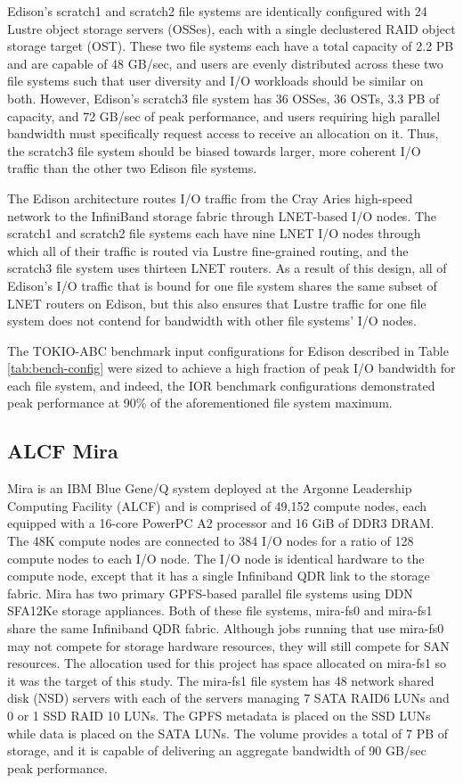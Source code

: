Edison's scratch1 and scratch2 file systems are identically configured with 24 Lustre object storage servers (OSSes), each with a single declustered RAID object storage target (OST).
These two file systems each have a total capacity of 2.2 PB and are capable of 48 GB/sec, and users are evenly distributed across these two file systems such that user diversity and I/O workloads should be similar on both.
However, Edison's scratch3 file system has 36 OSSes, 36 OSTs, 3.3 PB of capacity, and 72 GB/sec of peak performance, and users requiring high parallel bandwidth must specifically request access to receive an allocation on it.  Thus, the scratch3 file system should be biased towards larger, more coherent I/O traffic than the other two Edison file systems.

The Edison architecture routes I/O traffic from the Cray Aries high-speed network to the InfiniBand storage fabric through LNET-based I/O nodes.
The scratch1 and scratch2 file systems each have nine LNET I/O nodes through which all of their traffic is routed via Lustre fine-grained routing, and the scratch3 file system uses thirteen LNET routers.
As a result of this design, all of Edison's I/O traffic that is bound for one file system shares the same subset of LNET routers on Edison, but this also ensures that Lustre traffic for one file system does not contend for bandwidth with other file systems' I/O nodes.

The TOKIO-ABC benchmark input configurations for Edison described in Table \ref{tab:bench-config} were sized to achieve a high fraction of peak I/O bandwidth for each file system, and indeed, the IOR benchmark configurations demonstrated peak performance at 90\% of the aforementioned file system maximum.

\subsection{ALCF Mira} \label{sec:platforms/mira}

 Mira is an IBM Blue Gene/Q system deployed at the Argonne Leadership Computing Facility (ALCF) and is comprised of 49,152 compute nodes, each equipped with a 16-core PowerPC A2 processor and 16 GiB of DDR3 DRAM. The 48K 
compute nodes are connected to 384 I/O nodes for a ratio of 128 compute nodes
to each I/O node. The I/O node is identical hardware to the compute node,
except that it has a single Infiniband QDR link to the storage fabric.
Mira has two primary GPFS-based parallel file systems using DDN SFA12Ke storage appliances.
Both of these file systems, mira-fs0 and mira-fs1 share the same
Infiniband QDR fabric. Although jobs running that use mira-fs0 may not compete
for storage hardware resources, they will still compete for SAN resources.
The allocation used for this project has space allocated on mira-fs1 so it 
was the target of this study.
The mira-fs1 file system has 48 network shared disk (NSD) servers with each of the
servers managing 7 SATA RAID6 LUNs and 0 or 1 SSD RAID 10 LUNs. The GPFS metadata
is placed on the SSD LUNs while data is placed on the SATA LUNs. The volume provides a total of 7 PB of storage, and it is capable of delivering an aggregate bandwidth of 90 GB/sec peak performance.

